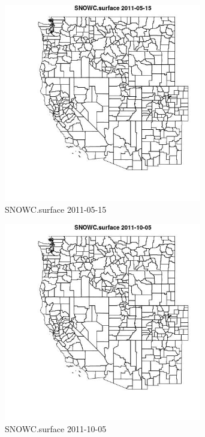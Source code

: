 \begin{figure} 
\centering  
\includegraphics[width=0.77\textwidth]{Code_Outputs/ML_input_report_ML_input_PM25_Step5_part_d_de_duplicated_aves_ML_input_MapObsSNOWCsurface2011-05-15.jpg} 
\caption{\label{fig:ML_input_report_ML_input_PM25_Step5_part_d_de_duplicated_aves_ML_inputMapObsSNOWCsurface2011-05-15}SNOWC.surface 2011-05-15} 
\end{figure} 
 

\begin{figure} 
\centering  
\includegraphics[width=0.77\textwidth]{Code_Outputs/ML_input_report_ML_input_PM25_Step5_part_d_de_duplicated_aves_ML_input_MapObsSNOWCsurface2011-10-05.jpg} 
\caption{\label{fig:ML_input_report_ML_input_PM25_Step5_part_d_de_duplicated_aves_ML_inputMapObsSNOWCsurface2011-10-05}SNOWC.surface 2011-10-05} 
\end{figure} 
 

